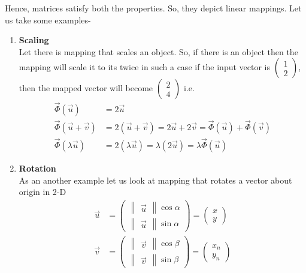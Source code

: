 \documentclass{article}
\begin{document}
Hence, matrices satisfy both the properties. So, they depict linear mappings. Let us take some examples-\\
\begin{enumerate}
    \item \textbf{Scaling}\\
Let there is mapping that scales an object. So, if there is an object then the mapping will scale it to its twice in such a case if the input vector is \(\begin{pmatrix}  1\\2 \end{pmatrix}\), then the mapped vector will become \(\begin{pmatrix} 2\\4 \end{pmatrix}\) i.e. 
\begin{align}
    \vec{\Phi}(\Vec{u}) &= 2\Vec{u} \nonumber \\
    \vec{\Phi}(\Vec{u} + \Vec{v}) &= 2(\Vec{u} + \Vec{v}) = 2\Vec{u} + 2\Vec{v} = \vec{\Phi}(\Vec{u}) + \vec{\Phi}(\Vec{v}) \nonumber \\
    \vec{\Phi}(\lambda\Vec{u}) &= 2(\lambda\Vec{u}) = \lambda(2\Vec{u}) = \lambda\vec{\Phi}(\Vec{u}) \nonumber
\end{align}
\item \textbf{Rotation}\\
As an another example let us look at mapping that rotates a vector about origin in 2-D
\begin{align}
    \Vec{u} &= \begin{pmatrix}\begin{Vmatrix}\vec{u}\end{Vmatrix}\cos\alpha\\\begin{Vmatrix}\vec{u}\end{Vmatrix}\sin\alpha\end{pmatrix} = \begin{pmatrix}x\\y\end{pmatrix} \nonumber \\
    \Vec{v} &= \begin{pmatrix}\begin{Vmatrix}\Vec{v}\end{Vmatrix}\cos\beta\\\begin{Vmatrix}\Vec{v}\end{Vmatrix}\sin\beta\end{pmatrix} = \begin{pmatrix}x_n\\y_n\end{pmatrix} \nonumber

\end{align}
\end{enumerate}
\end{document}
